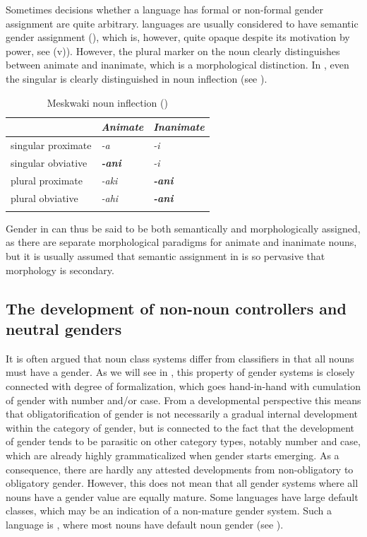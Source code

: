 \documentclass[output=collectionpaper]{langsci/langscibook}
\begin{document}
Sometimes decisions whether a language has formal or non-formal gender assignment are quite arbitrary.  languages are usually considered to have semantic gender assignment (\citealt[24]{Corbett1991}), which is, however, quite opaque despite its motivation by power, see  (v)). However, the plural marker on the noun clearly distinguishes between animate and inanimate, which is a morphological distinction. In , even the singular is clearly distinguished in noun inflection (see ).

\begin{table}
  \caption{Meskwaki noun inflection (\citealt[10]{Thomason2003})}
\begin{tabular}{l>{\itshape}l>{\itshape}l}
\lsptoprule
  &	\normalfont Animate	& \normalfont	Inanimate	\\
\midrule
singular proximate	&	-a	&	-i	\\
singular obviative	&	\bfseries -ani	&	-i	\\
plural proximate	&	-aki	&	\bfseries -ani	\\
plural obviative	&	-ahi	&	\bfseries -ani	\\
\lspbottomrule
\end{tabular}
\label{tab:WDG:15}
\end{table}

Gender in  can thus be said to be both semantically and morphologically assigned, as there are separate morphological paradigms for animate and inanimate nouns, but it is usually assumed that semantic assignment in  is so pervasive that morphology is secondary.

  \subsection{The development of non-noun controllers and neutral genders}
\label{sec:WDG:6.5}

It is often argued that noun class systems differ from classifiers in that all nouns must have a gender. As we will see in , this property of gender systems is closely connected with degree of formalization, which goes hand-in-hand with cumulation of gender with number and/or case. From a developmental perspective this means that obligatorification of gender is not necessarily a gradual internal development within the category of gender, but is connected to the fact that the development of gender tends to be parasitic on other category types, notably number and case, which are already highly grammaticalized when gender starts emerging. As a consequence, there are hardly any attested developments from non-obligatory to obligatory gender. However, this does not mean that all gender systems where all nouns have a gender value are equally mature. Some languages have large default classes, which may be an indication of a non-mature gender system. Such a language is , where most nouns have default noun gender (see \citealt{Waelchli2018}).
\end{document}
